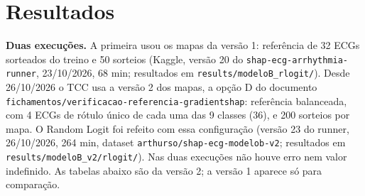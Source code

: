 \documentclass[11pt,a4paper]{article}
\begin{document}
\section{Resultados}\label{sec:resultados}
\textbf{Duas execuções.} A primeira usou os mapas da versão 1: referência de 32 ECGs sorteados do treino e 50 sorteios (Kaggle, versão 20 do \texttt{shap-ecg-arrhythmia-runner}, 23/10/2026, 68 min; resultados em \texttt{results/modeloB\_rlogit/}). Desde 26/10/2026 o TCC usa a versão 2 dos mapas, a opção D do documento \texttt{fichamentos/verificacao-referencia-gradientshap}: referência balanceada, com 4 ECGs de rótulo único de cada uma das 9 classes (36), e 200 sorteios por mapa. O Random Logit foi refeito com essa configuração (versão 23 do runner, 26/10/2026, 264 min, dataset \texttt{arthurso/shap-ecg-modelob-v2}; resultados em \texttt{results/modeloB\_v2/rlogit/}). Nas duas execuções não houve erro nem valor indefinido. As tabelas abaixo são da versão 2; a versão 1 aparece só para comparação.
\end{document}
